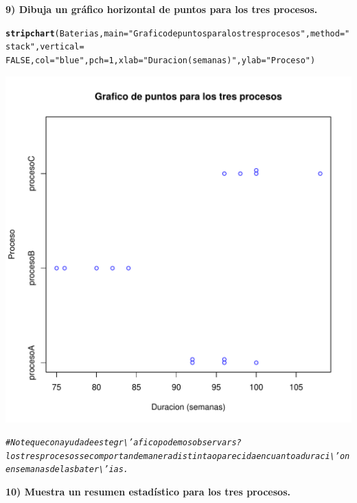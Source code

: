 \documentclass[12pt,letterpaper]{article}\usepackage[]{graphicx}\usepackage[]{color}
\makeatletter
\def\maxwidth{ %
  \ifdim\Gin@nat@width>\linewidth
    \linewidth
  \else
    \Gin@nat@width
  \fi
}
\newcommand{\hlnum}[1]{\textcolor[rgb]{0.686,0.059,0.569}{#1}}%
\newcommand{\hlstr}[1]{\textcolor[rgb]{0.192,0.494,0.8}{#1}}%
\newcommand{\hlcom}[1]{\textcolor[rgb]{0.678,0.584,0.686}{\textit{#1}}}%
\newcommand{\hlstd}[1]{\textcolor[rgb]{0.345,0.345,0.345}{#1}}%
\newcommand{\hlkwc}[1]{\textcolor[rgb]{0.333,0.667,0.333}{#1}}%
\newcommand{\hlkwd}[1]{\textcolor[rgb]{0.737,0.353,0.396}{\textbf{#1}}}%
\newenvironment{kframe}{%
 \def\at@end@of@kframe{}%
 \ifinner\ifhmode%
  \def\at@end@of@kframe{\end{minipage}}%
  \begin{minipage}{\columnwidth}%
 \fi\fi%
 \def\FrameCommand##1{\hskip\@totalleftmargin \hskip-\fboxsep
 \colorbox{shadecolor}{##1}\hskip-\fboxsep
     \hskip-\linewidth \hskip-\@totalleftmargin \hskip\columnwidth}%
 \MakeFramed {\advance\hsize-\width
   \@totalleftmargin\z@ \linewidth\hsize
   \@setminipage}}%
 {\par\unskip\endMakeFramed%
 \at@end@of@kframe}
\newenvironment{knitrout}{}{} %
\makeatother
\begin{document}
\textbf{9) Dibuja un gr\'afico horizontal de puntos para los tres procesos.} 
\begin{knitrout}
\color{fgcolor}\begin{kframe}
\begin{alltt}
\hlkwd{stripchart}\hlstd{(Baterias,} \hlkwc{main}\hlstd{=}\hlstr{"Grafico de puntos para los tres procesos"}\hlstd{,} \hlkwc{method} \hlstd{=} \hlstr{"stack"}\hlstd{,} \hlkwc{vertical} \hlstd{=}
\hlnum{FALSE}\hlstd{,} \hlkwc{col}\hlstd{=}\hlstr{"blue"}\hlstd{,} \hlkwc{pch}\hlstd{=}\hlnum{1}\hlstd{,} \hlkwc{xlab}\hlstd{=}\hlstr{"Duracion (semanas)"}\hlstd{,} \hlkwc{ylab}\hlstd{=}\hlstr{"Proceso"}\hlstd{)}
\end{alltt}
\end{kframe}
\includegraphics[width=\maxwidth]{figure/unnamed-chunk-8-1} 
\begin{kframe}\begin{alltt}
\hlcom{# Note que con ayuda de este gr\textbackslash{}'afico podemos observar s? los tres procesos se comportan de manera distinta o parecida en cuanto a duraci\textbackslash{}'on en semanas de las bater\textbackslash{}'ias.}
\end{alltt}
\end{kframe}
\end{knitrout}
\textbf{10) Muestra un resumen estad\'istico para los tres procesos.} 
\end{document}
